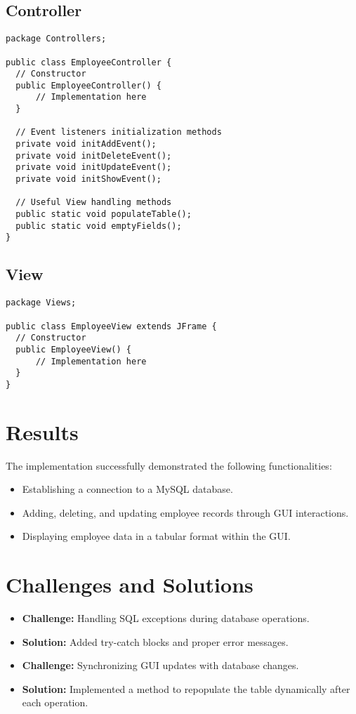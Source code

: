 \documentclass[12pt]{article}
\begin{document}
\subsection{Controller}
\begin{lstlisting}
package Controllers;

public class EmployeeController {
  // Constructor
  public EmployeeController() {
      // Implementation here
  }
  
  // Event listeners initialization methods
  private void initAddEvent();
  private void initDeleteEvent();
  private void initUpdateEvent();
  private void initShowEvent();
  
  // Useful View handling methods
  public static void populateTable();
  public static void emptyFields();
}
\end{lstlisting}

\subsection{View}
\begin{lstlisting}
package Views;

public class EmployeeView extends JFrame {
  // Constructor
  public EmployeeView() {
      // Implementation here
  }
}
\end{lstlisting}

\section{Results}


The implementation successfully demonstrated the following functionalities:
\begin{itemize}
    \item Establishing a connection to a MySQL database.
    \item Adding, deleting, and updating employee records through GUI interactions.
    \item Displaying employee data in a tabular format within the GUI.
\end{itemize}

\section{Challenges and Solutions}
\begin{itemize}
    \item \textbf{Challenge:} Handling SQL exceptions during database operations.
    \item \textbf{Solution:} Added try-catch blocks and proper error messages.
    \item \textbf{Challenge:} Synchronizing GUI updates with database changes.
    \item \textbf{Solution:} Implemented a method to repopulate the table dynamically after each operation.
\end{itemize}
\end{document}
